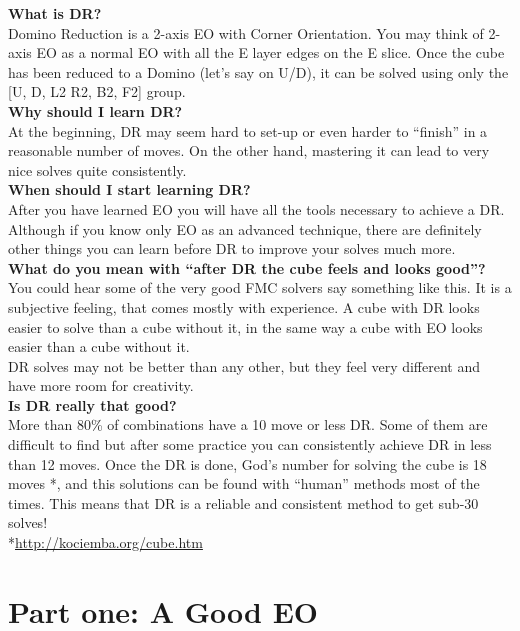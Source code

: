 \documentclass[11pt,a4paper]{book}
\begin{document}
\textbf{What is DR?}\\
Domino Reduction is a 2-axis EO with Corner Orientation. You may think of 2-axis EO as a normal EO with all the E layer edges on the E slice. Once the cube has been reduced to a Domino (let’s say on U/D), it can be solved using only the  [U, D, L2 R2, B2, F2] group.\\
\newline
\textbf{Why  should I learn DR?}\\
At the beginning, DR may seem hard to set-up or even harder to “finish” in a reasonable number of moves. On the other hand, mastering it can lead to very nice solves quite consistently.\\
\newline
\textbf{When should I start learning DR?}\\
After you have learned EO you will have all the tools necessary to achieve a DR.
Although if you know only EO as an advanced technique, there are definitely other things you can learn  before DR to improve your solves much more.\\
\newline
\textbf {What do you mean with “after DR the cube feels and looks good”?}\\
You could hear some of the very good FMC solvers say something like this. It is a subjective feeling, that comes mostly with experience. A cube with DR looks easier to solve than a cube without it, in the same way a cube with EO looks easier than a cube without it.\\
DR solves may not be better than any other, but they feel very different and have more room  for creativity.\\
\newline
\textbf{Is DR really that good?}\\
More than 80\%  of combinations have a 10 move or less DR. Some of them are difficult to find but after some practice you can consistently achieve DR in less than 12 moves. Once the DR is done, God’s number for solving the cube is 18 moves *, and this solutions can be found with “human” methods most of the times. This means  that DR is a reliable and consistent method to get sub-30 solves!\\
\footnotesize{*\href{http://kociemba.org/cube.htm}{http://kociemba.org/cube.htm}}


\chapter{Part one:  A Good EO}
\end{document}
